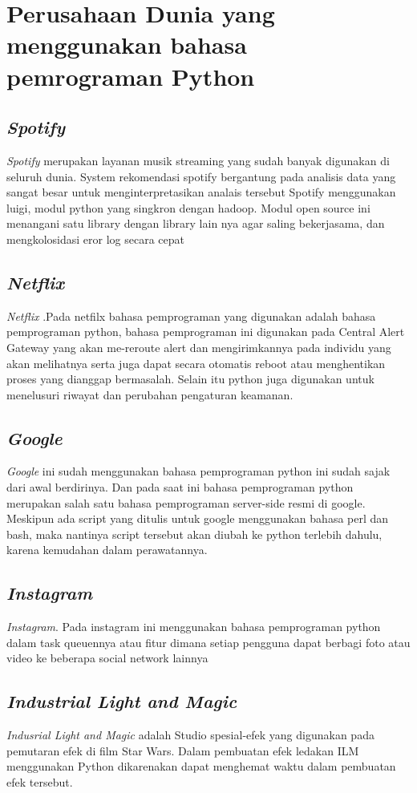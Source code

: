 \chapter*{Perusahaan Dunia yang menggunakan bahasa pemrograman Python}

\section*{\textit{Spotify}}
\par
\textit{Spotify} merupakan layanan musik streaming yang sudah banyak digunakan di seluruh dunia. System rekomendasi spotify bergantung pada analisis data yang sangat besar untuk menginterpretasikan analais tersebut Spotify menggunakan luigi, modul python yang singkron dengan hadoop. Modul open source ini menangani satu library dengan library lain nya agar saling bekerjasama, dan mengkolosidasi eror log secara cepat

\section*{\textit{Netflix}}
\par
\textit{Netflix} .Pada netfilx bahasa pemprograman yang digunakan adalah bahasa pemprograman python, bahasa pemprograman ini digunakan pada Central Alert Gateway yang akan me-reroute alert dan mengirimkannya pada individu yang akan melihatnya serta juga  dapat secara otomatis reboot atau menghentikan proses yang dianggap bermasalah. Selain itu python juga digunakan untuk menelusuri riwayat dan perubahan pengaturan keamanan.

\section*{\textit{Google}}
\par
\textit{Google} ini sudah menggunakan bahasa pemprograman python ini sudah sajak dari awal berdirinya. Dan pada saat ini bahasa pemprograman python merupakan salah satu bahasa pemprograman server-side resmi di google. Meskipun ada script yang ditulis untuk google menggunakan bahasa perl dan bash, maka nantinya script tersebut akan diubah ke python terlebih dahulu, karena kemudahan dalam perawatannya.
\section*{\textit{Instagram}}
\par
\textit{Instagram}. Pada instagram ini menggunakan bahasa pemprograman python dalam task queuennya atau fitur dimana setiap pengguna dapat berbagi foto atau video ke beberapa social network lainnya  

\section*{\textit{Industrial Light and Magic}}
\textit{Indusrial Light and Magic} adalah Studio spesial-efek yang digunakan pada pemutaran efek di film Star Wars. Dalam pembuatan efek ledakan ILM menggunakan Python dikarenakan dapat menghemat waktu dalam pembuatan efek tersebut.   
\par


